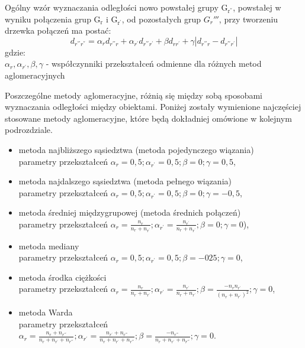 \documentclass[12pt,a4paper]{report}
\begin{document}
Ogólny wzór wyznaczania odległości nowo powstałej grupy $\mathrm{G_{r^{''}}}$, powstałej w wyniku połączenia grup $\mathrm{G_{r}}$ i $\mathrm{G_{r^{'}}}$, od pozostałych grup ${G_r{'''}}$, przy tworzeniu drzewka połączeń ma postać:
\begin{equation}
d_{r^{'''}r^{''}}=\alpha_{r}d_{r^{'''}r} + \alpha_{r^{'}}d_{r^{'''}r^{'}} + \beta d_{rr^{'}} + \gamma|d_{r^{'''}r} - d_{r^{'''}r^{'}}| 
\end{equation}
gdzie:\\
$\alpha_{r},\alpha_{r^{'}}, \beta, \gamma$ - współczynniki przekształceń odmienne dla różnych metod aglomeracyjnych

Poszczególne metody aglomeracyjne, różnią się między sobą sposobami wyznaczania odległości między obiektami. Poniżej zostały wymienione najczęściej stosowane metody aglomeracyjne, które będą dokładniej omówione w kolejnym podrozdziale.
\begin{itemize}
\item metoda najbliższego sąsiedztwa (metoda pojedynczego wiązania) \\
parametry  przekształceń $\alpha_{r}=0,5; \alpha_{r^{'}}=0,5; \beta=0; \gamma=0,5$,
\item metoda najdalszego sąsiedztwa (metoda pełnego wiązania)\\
parametry  przekształceń $\alpha_{r}=0,5; \alpha_{r^{'}}=0,5; \beta=0; \gamma=-0,5$,
\item metoda średniej międzygrupowej (metoda średnich połączeń)\\
parametry  przekształceń $\alpha_{r}=\frac{n_{r}}{n_{r} + n_{r^{'}}}; \alpha_{r^{'}}=\frac{n_{r^{'}}}{n_{r} + n_{r^{'}}}; \beta=0; \gamma=0$),
\item metoda mediany\\
parametry  przekształceń $\alpha_{r}=0,5; \alpha_{r^{'}}=0,5; \beta=-025; \gamma=0$,
\item metoda środka ciężkości\\
parametry  przekształceń $\alpha_{r}=\frac{n_{r}}{n_{r} + n_{r^{'}}}; \alpha_{r^{'}}=\frac{n_{r^{'}}}{n_{r} + n_{r^{'}}}; \beta=\frac{-n_{r}n_{r^{'}}}{(n_{r} + n_{r^{'}})^{2}}; \gamma=0$,
\item metoda Warda\\
parametry  przekształceń $\alpha_{r}=\frac{n_{r}+n_{r^{'''}}}{n_{r} + n_{r^{'}}+n_{r^{'''}}}; \alpha_{r^{'}}=\frac{n_{r^{'}}+n_{r^{'''}}}{n_{r} + n_{r^{'}}+n_{r^{'''}}}; \beta=\frac{-n_{r^{'''}}}{n_{r} + n_{r^{'}}+n_{r^{'''}}}; \gamma=0$.

\end{itemize}
 
\end{document}
